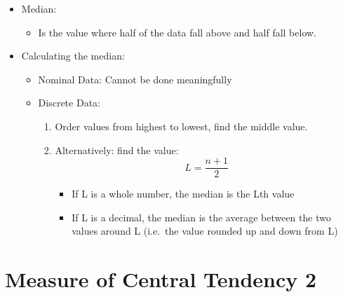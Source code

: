 \documentclass[12pt]{article}
\begin{document}
\begin{itemize}
\itemsep1pt\parskip0pt
\item
  Median:

  \begin{itemize}
  \itemsep1pt\parskip0pt
  \item
    Is the value where half of the data fall above and half fall below.
  \end{itemize}
\item
  Calculating the median:

  \begin{itemize}
  \itemsep1pt\parskip0pt
  \item
    Nominal Data: Cannot be done meaningfully
  \item
    Discrete Data:

    \begin{enumerate}
    \def\labelenumi{\arabic{enumi}.}
    \itemsep1pt\parskip0pt
    \item
      Order values from highest to lowest, find the middle value.
    \item
      Alternatively: find the value: \[ L = \frac{n+1}{2} \]

      \begin{itemize}
      \itemsep1pt\parskip0pt
      \item
        If L is a whole number, the median is the Lth value
      \item
        If L is a decimal, the median is the average between the two
        values around L (i.e.~the value rounded up and down from L)
      \end{itemize}
    \end{enumerate}
  \end{itemize}
\end{itemize}

\section{Measure of Central Tendency
2}\label{measure-of-central-tendency-2-1}
\end{document}
